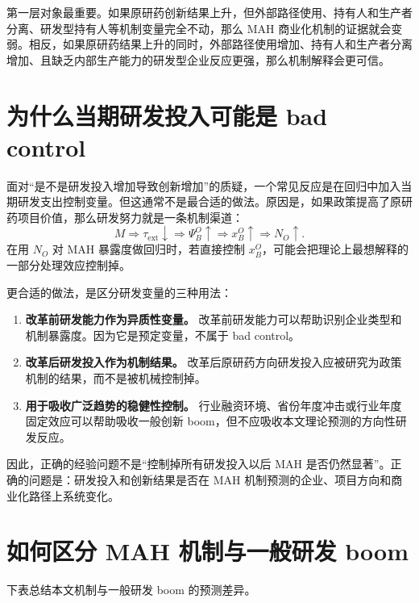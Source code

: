\documentclass[12pt]{article}
\newcommand{\tauext}{\tau_{\mathrm{ext}}}
\begin{document}
第一层对象最重要。如果原研药创新结果上升，但外部路径使用、持有人和生产者分离、研发型持有人等机制变量完全不动，那么 MAH 商业化机制的证据就会变弱。相反，如果原研药结果上升的同时，外部路径使用增加、持有人和生产者分离增加、且缺乏内部生产能力的研发型企业反应更强，那么机制解释会更可信。

\section{为什么当期研发投入可能是 bad control}

面对“是不是研发投入增加导致创新增加”的质疑，一个常见反应是在回归中加入当期研发支出控制变量。但这通常不是最合适的做法。原因是，如果政策提高了原研药项目价值，那么研发努力就是一条机制渠道：
\[
M \Rightarrow \tauext\downarrow \Rightarrow \Psi_B^O\uparrow \Rightarrow x_B^O\uparrow \Rightarrow N_O\uparrow.
\]
在用 $N_O$ 对 MAH 暴露度做回归时，若直接控制 $x_B^O$，可能会把理论上最想解释的一部分处理效应控制掉。

更合适的做法，是区分研发变量的三种用法：
\begin{enumerate}
    \item \textbf{改革前研发能力作为异质性变量。} 改革前研发能力可以帮助识别企业类型和机制暴露度。因为它是预定变量，不属于 bad control。
    \item \textbf{改革后研发投入作为机制结果。} 改革后原研药方向研发投入应被研究为政策机制的结果，而不是被机械控制掉。
    \item \textbf{用于吸收广泛趋势的稳健性控制。} 行业融资环境、省份年度冲击或行业年度固定效应可以帮助吸收一般创新 boom，但不应吸收本文理论预测的方向性研发反应。
\end{enumerate}
因此，正确的经验问题不是“控制掉所有研发投入以后 MAH 是否仍然显著”。正确的问题是：研发投入和创新结果是否在 MAH 机制预测的企业、项目方向和商业化路径上系统变化。

\section{如何区分 MAH 机制与一般研发 boom}

下表总结本文机制与一般研发 boom 的预测差异。
\end{document}
